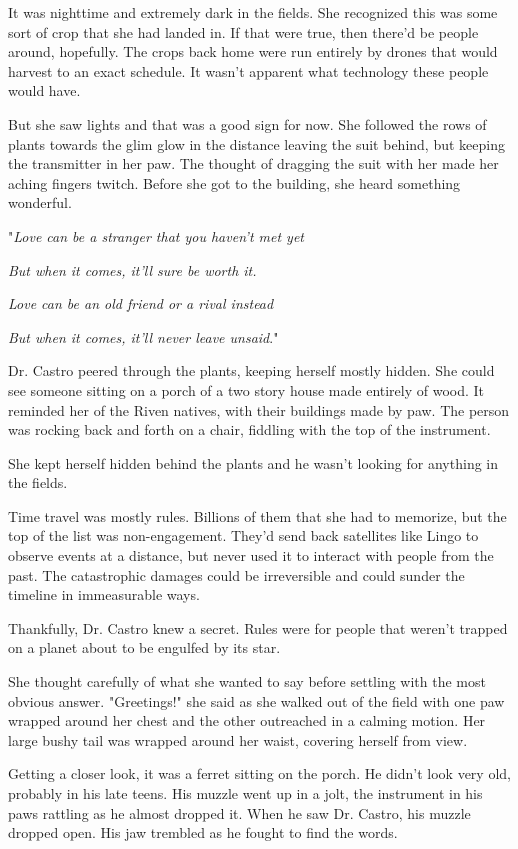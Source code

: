 It was nighttime and extremely dark in the fields. She recognized this was some sort of crop that she had landed in. If that were true, then there'd be people around, hopefully. The crops back home were run entirely by drones that would harvest to an exact schedule. It wasn't apparent what technology these people would have.

But she saw lights and that was a good sign for now. She followed the rows of plants towards the glim glow in the distance leaving the suit behind, but keeping the transmitter in her paw. The thought of dragging the suit with her made her aching fingers twitch. Before she got to the building, she heard something wonderful.

"\emph{Love can be a stranger that you haven't met yet}

\emph{But when it comes, it'll sure be worth it.}

\emph{Love can be an old friend or a rival instead}

\emph{But when it comes, it'll never leave unsaid}."

Dr. Castro peered through the plants, keeping herself mostly hidden. She could see someone sitting on a porch of a two story house made entirely of wood. It reminded her of the Riven natives, with their buildings made by paw. The person was rocking back and forth on a chair, fiddling with the top of the instrument.

She kept herself hidden behind the plants and he wasn't looking for anything in the fields.

Time travel was mostly rules. Billions of them that she had to memorize, but the top of the list was non-engagement. They'd send back satellites like Lingo to observe events at a distance, but never used it to interact with people from the past. The catastrophic damages could be irreversible and could sunder the timeline in immeasurable ways.

Thankfully, Dr. Castro knew a secret. Rules were for people that weren't trapped on a planet about to be engulfed by its star.

She thought carefully of what she wanted to say before settling with the most obvious answer. "Greetings!" she said as she walked out of the field with one paw wrapped around her chest and the other outreached in a calming motion. Her large bushy tail was wrapped around her waist, covering herself from view.

Getting a closer look, it was a ferret sitting on the porch. He didn't look very old, probably in his late teens. His muzzle went up in a jolt, the instrument in his paws rattling as he almost dropped it. When he saw Dr. Castro, his muzzle dropped open. His jaw trembled as he fought to find the words.


